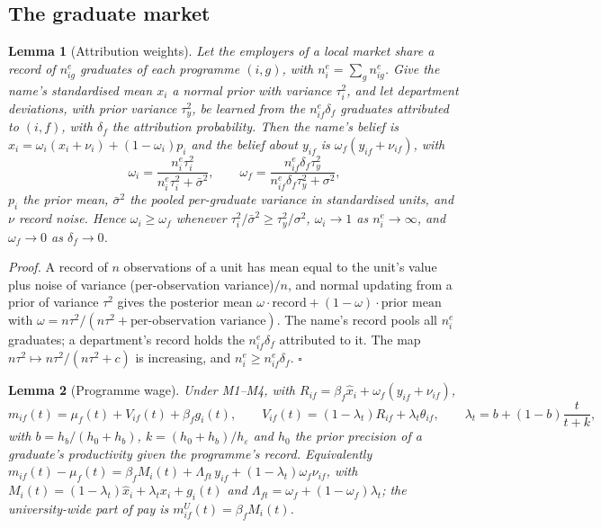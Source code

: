 \documentclass[11pt]{article}
\newtheorem{slemma}{Lemma}
\newcommand{\qedsq}{\hfill$\square$}
\begin{document}
\subsection{The graduate market}

\begin{slemma}[Attribution weights]\label{lem:umbrella}
Let the employers of a local market share a record of $n^e_{ig}$ graduates of each programme $(i,g)$, with
$n^e_i=\sum_gn^e_{ig}$. Give the name's standardised mean $x_i$ a normal prior with variance $\tau_i^2$, and let
department deviations, with prior variance $\tau_y^2$, be learned from the $n^e_{if}\delta_f$ graduates attributed
to $(i,f)$, with $\delta_f$ the attribution probability. Then the name's belief is
$\hat x_i=\omega_i(x_i+\nu_i)+(1-\omega_i)p_i$ and the belief about $y_{if}$ is $\omega_f(y_{if}+\nu_{if})$, with
\[
\omega_i=\frac{n^e_i\tau_i^2}{n^e_i\tau_i^2+\bar\sigma^2},\qquad
\omega_f=\frac{n^e_{if}\delta_f\tau_y^2}{n^e_{if}\delta_f\tau_y^2+\sigma^2},
\]
$p_i$ the prior mean, $\bar\sigma^2$ the pooled per-graduate variance in standardised units, and $\nu$ record
noise. Hence $\omega_i\ge\omega_f$ whenever $\tau_i^2/\bar\sigma^2\ge\tau_y^2/\sigma^2$, $\omega_i\to1$ as
$n^e_i\to\infty$, and $\omega_f\to0$ as $\delta_f\to0$.
\end{slemma}

\emph{Proof.} A record of $n$ observations of a unit has mean equal to the unit's value plus noise of variance
(per-observation variance)$/n$, and normal updating from a prior of variance $\tau^2$ gives the posterior mean
$\omega\cdot\text{record}+(1-\omega)\cdot\text{prior mean}$ with $\omega=n\tau^2/(n\tau^2+\text{per-observation
variance})$. The name's record pools all $n^e_i$ graduates; a department's record holds the $n^e_{if}\delta_f$
attributed to it. The map $n\tau^2\mapsto n\tau^2/(n\tau^2+c)$ is increasing, and $n^e_i\ge n^e_{if}\delta_f$.
\qedsq

\begin{slemma}[Programme wage]\label{lem:wage}
Under M1--M4, with $R_{if}=\beta_f\hat x_i+\omega_f(y_{if}+\nu_{if})$,
\[
m_{if}(t)=\mu_f(t)+V_{if}(t)+\beta_fg_i(t),\qquad V_{if}(t)=(1-\lambda_t)R_{if}+\lambda_t\theta_{if},\qquad
\lambda_t=b+(1-b)\frac{t}{t+k},
\]
with $b=h_b/(h_0+h_b)$, $k=(h_0+h_b)/h_\varepsilon$ and $h_0$ the prior precision of a graduate's productivity
given the programme's record. Equivalently $m_{if}(t)-\mu_f(t)=\beta_fM_i(t)+\Lambda_{ft}\,y_{if}+
(1-\lambda_t)\omega_f\nu_{if}$, with $M_i(t)=(1-\lambda_t)\hat x_i+\lambda_tx_i+g_i(t)$ and
$\Lambda_{ft}=\omega_f+(1-\omega_f)\lambda_t$; the university-wide part of pay is $m^U_{if}(t)=\beta_fM_i(t)$.
\end{slemma}
\end{document}
